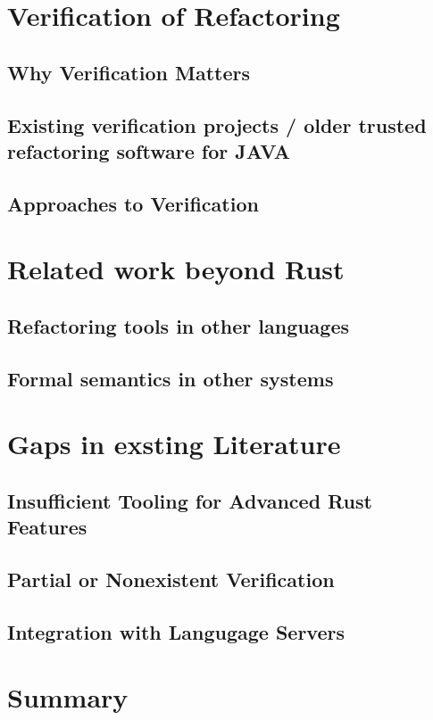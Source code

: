 \section{Verification of Refactoring}
\label{sec:verification_refactoring}

\subsection{Why Verification Matters}
\label{sec:why_verification_matters}

\subsection{Existing verification projects / older trusted refactoring software for JAVA}
\label{sec:existing_verification_projects}

\subsection{Approaches to Verification}
\label{sec:approaches_verification}

\section{Related work beyond Rust}
\label{sec:related_work_beyond_rust}

\subsection{Refactoring tools in other languages}
\label{sec:refactoring_tools_other_languages}

\subsection{Formal semantics in other systems}
\label{sec:formal_semantics_other_systems}

\section{Gaps in exsting Literature}
\label{sec:gaps_existing_literature}

\subsection{Insufficient Tooling for Advanced Rust Features}
\label{sec:insufficient_tooling_advanced_rust_features}

\subsection{Partial or Nonexistent Verification}
\label{sec:partial_nonexistent_verification}

\subsection{Integration with Langugage Servers}
\label{sec:integration_language_servers}

\section{Summary}
\label{sec:summary_lit_review}


\renewcommand\thefigure{\thechapter .\arabic{figure}}